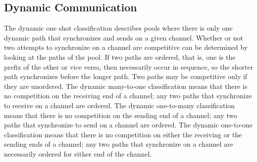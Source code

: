 \documentclass[letterpaper, 11pt]{extarticle}
\begin{document}
\subsection{Dynamic Communication}

The dynamic one shot classification describes pools where there is only one dynamic path
that synchronizes and sends on a given channel. Whether or not two attempts to
synchronize on a channel are competitive can be determined by
looking at the paths of the pool. If two paths are ordered, that is, one is the
prefix of the other or vice versa, then necessarily
occur in sequence, so the shorter path synchronizes before the longer path. Two paths may
be competitive only if they are unordered. The dynamic many-to-one classification means that
there is no competition on the receiving end of a channel; any two paths that synchronize to
receive on a channel are ordered. The dynamic one-to-many classification means that there
is no competition on the sending end of a channel; any two paths that synchronize to
send on a channel are ordered. The dynamic one-to-one classification means that there is no
competition on either the receiving or the sending ends of a channel; any two paths that
synchronize on a channel are necessarily ordered for either end of the channel. 
\end{document}
